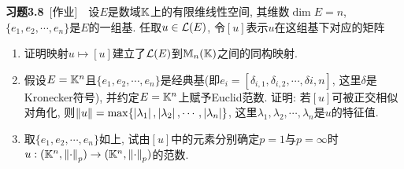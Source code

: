     \textbf{习题3.8}\ [作业]\ \ 设$ E $是数域$ \mathbb{K} $上的有限维线性空间, 其维数$ \dim E=n $, $ \{ e_1,e_2,\cdots,e_n \} $是$ E $的一组基. 任取$ u\in\mathcal{L}(E) $, 令$ [u] $表示$ u $在这组基下对应的矩阵
    \begin{enumerate}[(1)]
    \item 证明映射$ u\mapsto[u] $建立了$ \mathcal{L}(E) $到$ \mathbb{M}_n(\mathbb{K}) $之间的同构映射.
    \item 假设$ E=\mathbb{K}^n $且$ \{ e_1,e_2,\cdots,e_n \} $是经典基(即$ e_i=[\delta_{i,1},\delta_{i,2},\cdots,\delta{i,n}] $, 这里$ \delta $是Kronecker符号), 并约定$ E=\mathbb{K}^n $上赋予Euclid范数. 证明: 若$ [u] $可被正交相似对角化, 则$ \left\| u \right\|=\max\{ \left| \lambda_1 \right| ,\left| \lambda_2 \right| ,\cdots,\left| \lambda_n \right|  \} $, 这里$ \lambda_1,\lambda_2,\cdots,\lambda_n $是$ u $的特征值.
    \item 取$ \{ e_1,e_2,\cdots,e_n \} $如上, 试由$ [u] $中的元素分别确定$ p=1 $与$ p=\infty $时$ u : (\mathbb{K}^n,\left\| \cdot \right\|_p)\to(\mathbb{K}^n,\left\| \cdot \right\|_p) $的范数.
    \end{enumerate}
